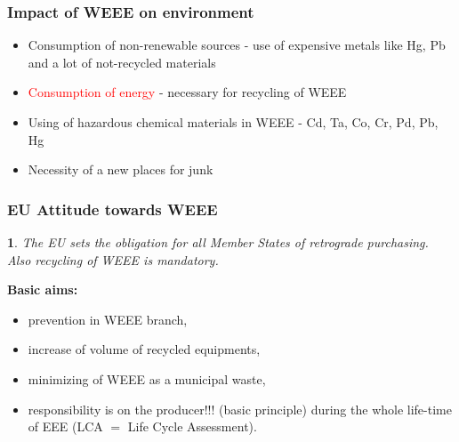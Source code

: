 \documentclass{beamer}
\newtheorem{myDef}{}
\begin{document}
	\begin{frame}
    \frametitle{Impact of WEEE on environment}
		
		\begin{itemize}
			\item Consumption of non-renewable sources - use of expensive metals like Hg, Pb and a lot of not-recycled materials
			\item \textcolor{red}{Consumption of energy} - necessary for recycling of WEEE
			\item Using of hazardous chemical materials in WEEE - Cd, Ta, Co, Cr, Pd, Pb, Hg
			\item Necessity of a new places for junk
		\end{itemize}
	\end{frame}
	\begin{frame}
    \frametitle{EU Attitude towards WEEE}
		
		\begin{myDef}
		The EU sets the obligation for all Member States of retrograde purchasing. Also recycling of WEEE is mandatory.
		\end{myDef}
		\textbf{Basic aims:}
		
		\begin{itemize}
			\item prevention in WEEE branch,
			\item increase of volume of recycled equipments,
			\item minimizing of WEEE as a municipal waste,
			\item responsibility is on the producer!!! (basic principle) during the whole life-time of EEE (LCA $=$ Life Cycle Assessment).

		\end{itemize}
	\end{frame}
\end{document}
